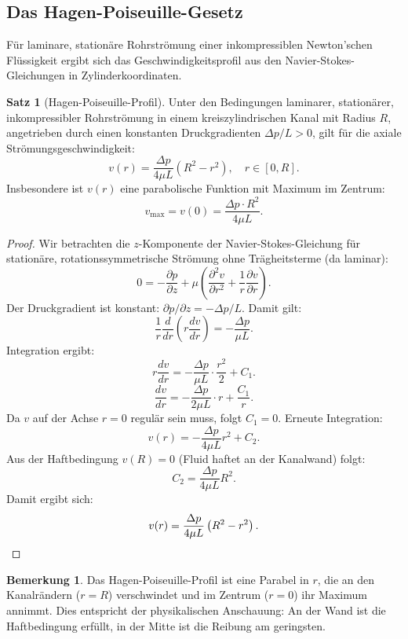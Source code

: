 ﻿\documentclass[a4paper,12pt]{article}
\theoremstyle{definition}
\newtheorem{satz}{Satz}
\newtheorem{bemerkung}{Bemerkung}
\begin{document}
\subsection{Das Hagen-Poiseuille-Gesetz}

Für laminare, stationäre Rohrströmung einer inkompressiblen Newton'schen Flüssigkeit
ergibt sich das Geschwindigkeitsprofil aus den Navier-Stokes-Gleichungen in Zylinderkoordinaten.

\begin{satz}[Hagen-Poiseuille-Profil]
\label{satz:hp}
    Unter den Bedingungen laminarer, stationärer, inkompressibler Rohrströmung in einem
    kreiszylindrischen Kanal mit Radius $R$, angetrieben durch einen konstanten
    Druckgradienten $\Delta p / L > 0$, gilt für die axiale Strömungsgeschwindigkeit:
    \[
    v(r) = \frac{\Delta p}{4\mu L} \left(R^2 - r^2\right), \quad r \in [0, R].
    \]
    Insbesondere ist $v(r)$ eine parabolische Funktion mit Maximum im Zentrum:
    \[
    v_{\max} = v(0) = \frac{\Delta p \cdot R^2}{4\mu L}.
    \]
\end{satz}

\begin{proof}
Wir betrachten die $z$-Komponente der Navier-Stokes-Gleichung für stationäre, rotations\-sym\-me\-tri\-sche
Strömung ohne Trägheitsterme (da laminar):
\[
0 = -\frac{\partial p}{\partial z} + \mu \left(\frac{\partial^2 v}{\partial r^2}
    + \frac{1}{r}\frac{\partial v}{\partial r}\right).
\]
Der Druckgradient ist konstant: $\partial p / \partial z = -\Delta p / L$.
Damit gilt:
\[
\frac{1}{r}\frac{d}{dr}\left(r \frac{dv}{dr}\right) = -\frac{\Delta p}{\mu L}.
\]
Integration ergibt:
\[
r \frac{dv}{dr} = -\frac{\Delta p}{\mu L} \cdot \frac{r^2}{2} + C_1.
\]
\[
\frac{dv}{dr} = -\frac{\Delta p}{2\mu L} \cdot r + \frac{C_1}{r}.
\]
Da $v$ auf der Achse $r=0$ regulär sein muss, folgt $C_1 = 0$.
Erneute Integration:
\[
v(r) = -\frac{\Delta p}{4\mu L} r^2 + C_2.
\]
Aus der Haftbedingung $v(R) = 0$ (Fluid haftet an der Kanalwand) folgt:
\[
C_2 = \frac{\Delta p}{4\mu L} R^2.
\]
Damit ergibt sich:
\[
v(r) = \frac{\Delta p}{4\mu L}\left(R^2 - r^2\right). \qedhere
\]
\end{proof}

\begin{bemerkung}
Das Hagen-Poiseuille-Profil ist eine Parabel in $r$, die an den Kanalrändern
($r = R$) verschwindet und im Zentrum ($r = 0$) ihr Maximum annimmt. Dies entspricht
der physikalischen Anschauung: An der Wand ist die Haftbedingung erfüllt, in der Mitte
ist die Reibung am geringsten.
\end{bemerkung}
\end{document}
